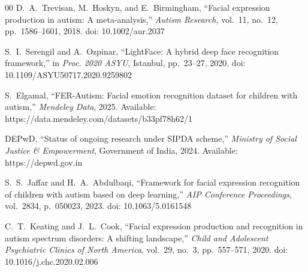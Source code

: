\documentclass[conference]{IEEEtran}
\begin{document}
\begin{thebibliography}{00}
D.~A.~Trevisan, M.~Hoskyn, and E.~Birmingham,
``Facial expression production in autism: A meta-analysis,''
\textit{Autism Research}, vol.~11, no.~12,
pp.~1586--1601, 2018. doi: 10.1002/aur.2037

S.~I.~Serengil and A.~Ozpinar, ``LightFace: A hybrid deep
face recognition framework,'' in \textit{Proc. 2020 ASYU},
Istanbul, pp.~23--27, 2020.
doi: 10.1109/ASYU50717.2020.9259802

S.~Elgamal, ``FER-Autism: Facial emotion recognition dataset
for children with autism,'' \textit{Mendeley Data}, 2025.
Available: https://data.mendeley.com/datasets/b33pf78h62/1

DEPwD, ``Status of ongoing research under SIPDA scheme,''
\textit{Ministry of Social Justice \& Empowerment},
Government of India, 2024.
Available: https://depwd.gov.in

S.~S.~Jaffar and H.~A.~Abdulbaqi, ``Framework for facial
expression recognition of children with autism based on
deep learning,'' \textit{AIP Conference Proceedings},
vol.~2834, p.~050023, 2023. doi: 10.1063/5.0161548

C.~T.~Keating and J.~L.~Cook, ``Facial expression production
and recognition in autism spectrum disorders: A shifting
landscape,'' \textit{Child and Adolescent Psychiatric Clinics
of North America}, vol.~29, no.~3, pp.~557--571, 2020.
doi: 10.1016/j.chc.2020.02.006

\end{thebibliography}
\end{document}
